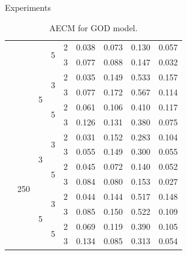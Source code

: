\documentclass{beamer}
\begin{document}
\begin{frame}{Experiments}
\begin{table}[H]
\begin{minipage}{.48\columnwidth}
\begin{adjustbox}{width=\columnwidth}
\begin{tabular}{lllllrrrr}
                \cline{4-9}
                 &  &  & \multirow[t]{2}{*}{5} & 2 & 0.038 & 0.073 & 0.130 & 0.057 \\
                 &  &  &  & 3 & 0.077 & 0.088 & 0.147 & 0.032 \\
                \cline{3-9} \cline{4-9}
                 &  & \multirow[t]{4}{*}{5} & \multirow[t]{2}{*}{3} & 2 & 0.035 & 0.149 & 0.533 & 0.157 \\
                 &  &  &  & 3 & 0.077 & 0.172 & 0.567 & 0.114 \\
                \cline{4-9}
                 &  &  & \multirow[t]{2}{*}{5} & 2 & 0.061 & 0.106 & 0.410 & 0.117 \\
                 &  &  &  & 3 & 0.126 & 0.131 & 0.380 & 0.075 \\
                \cline{2-9} \cline{3-9} \cline{4-9}
                 & \multirow[t]{8}{*}{250} & \multirow[t]{4}{*}{3} & \multirow[t]{2}{*}{3} & 2 & 0.031 & 0.152 & 0.283 & 0.104 \\
                 &  &  &  & 3 & 0.055 & 0.149 & 0.300 & 0.055 \\
                \cline{4-9}
                 &  &  & \multirow[t]{2}{*}{5} & 2 & 0.045 & 0.072 & 0.140 & 0.052 \\
                 &  &  &  & 3 & 0.084 & 0.080 & 0.153 & 0.027 \\
                \cline{3-9} \cline{4-9}
                 &  & \multirow[t]{4}{*}{5} & \multirow[t]{2}{*}{3} & 2 & 0.044 & 0.144 & 0.517 & 0.148 \\
                 &  &  &  & 3 & 0.085 & 0.150 & 0.522 & 0.109 \\
                \cline{4-9}
                 &  &  & \multirow[t]{2}{*}{5} & 2 & 0.069 & 0.119 & 0.390 & 0.105 \\
                 &  &  &  & 3 & 0.134 & 0.085 & 0.313 & 0.054 \\
                \cline{1-9} \cline{2-9} \cline{3-9} \cline{4-9}
                \end{tabular}
            \end{adjustbox}
            \caption*{AECM for GOD model.}
            \label{tab:results_god}
        \end{minipage}
    \end{table}
\end{frame}
\end{document}
